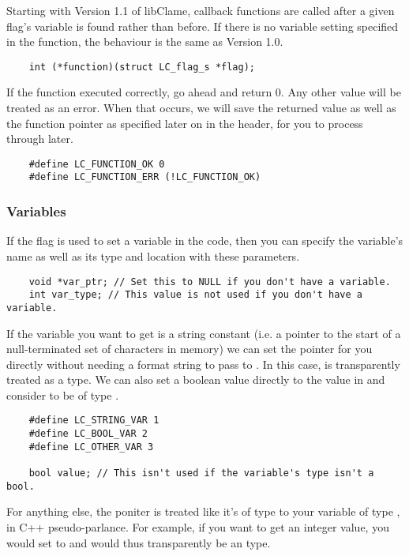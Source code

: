 Starting with Version 1.1 of libClame, callback functions are called after a given flag's variable is found rather than before. If there is no variable setting specified in the function, the behaviour is the same as Version 1.0.

\begin{verbatim}
	int (*function)(struct LC_flag_s *flag);
\end{verbatim}

If the function executed correctly, go ahead and return 0. Any other value will be treated as an error. When that occurs, we will save the returned value as well as the function pointer as specified later on in the header, for you to process through later.

\begin{verbatim}
	#define LC_FUNCTION_OK 0
	#define LC_FUNCTION_ERR (!LC_FUNCTION_OK)
\end{verbatim}

\subsubsection{Variables}
\label{sec:var-discussion}

If the flag is used to set a variable in the code, then you can specify the variable's name as well as its type and location with these parameters.

\begin{verbatim}
	void *var_ptr; // Set this to NULL if you don't have a variable.
	int var_type; // This value is not used if you don't have a variable.
\end{verbatim}

If the variable you want to get is a string constant (i.e. a pointer to the start of a null-terminated set of characters in memory) we can set the pointer for you directly without needing a format string to pass to . In this case,  is transparently treated as a  type. We can also set a boolean value directly to the value in  and consider  to be of type .

\begin{verbatim}
	#define LC_STRING_VAR 1
	#define LC_BOOL_VAR 2
	#define LC_OTHER_VAR 3

	bool value; // This isn't used if the variable's type isn't a bool.
\end{verbatim}

For anything else, the poniter is treated like it's of type  to your variable of type , in C++ pseudo-parlance. For example, if you want to get an integer value, you would set  to  and  would thus transparently be an  type.

